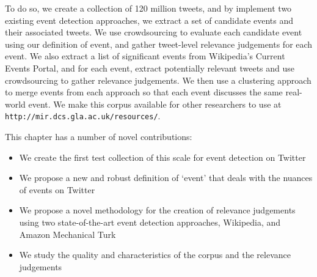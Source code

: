 To do so, we create a collection of 120 million tweets, and by implement two existing event detection approaches, we extract a set of candidate events and their associated tweets.
We use crowdsourcing to evaluate each candidate event using our definition of event, and gather tweet-level relevance judgements for each event.
We also extract a list of significant events from Wikipedia's Current Events Portal, and for each event, extract potentially relevant tweets and use crowdsourcing to gather relevance judgements.
We then use a clustering approach to merge events from each approach so that each event discusses the same real-world event.
We make this corpus available for other researchers to use at \texttt{http://mir.dcs.gla.ac.uk/resources/}.


This chapter has a number of novel contributions:
\begin{itemize}
\item We create the first test collection of this scale for event detection on Twitter
\item We propose a new and robust definition of `event' that deals with the nuances of events on Twitter
\item We propose a novel methodology for the creation of relevance judgements using two state-of-the-art event detection approaches, Wikipedia, and Amazon Mechanical Turk
\item We study the quality and characteristics of the corpus and the relevance judgements
\end{itemize}
